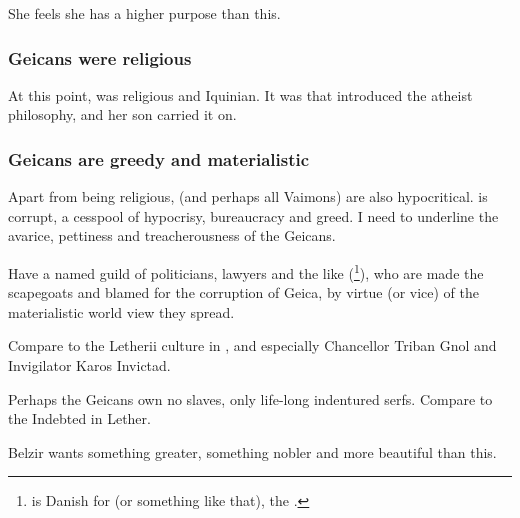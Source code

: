 She feels she has a higher purpose than this. 





\subsubsection{Geicans were religious}
At this point, \ClanGeican was religious and Iquinian.
It was \Belzir{} that introduced the atheist philosophy, and her son  carried it on. 





\subsubsection{Geicans are greedy and materialistic}
Apart from being religious, \ClanGeican (and perhaps all Vaimons) are also hypocritical. \ShiinMerodar{} is corrupt, a cesspool of hypocrisy, bureaucracy and greed. I need to underline the avarice, pettiness and treacherousness of the Geicans. 

Have a named guild of politicians, lawyers and the like (\footnote{\quo{\DJOF} is Danish for  (or something like that), the .}), who are made the scapegoats and blamed for the corruption of Geica, by virtue (or vice) of the materialistic world view they spread. 

Compare to the Letherii culture in \SEMalazan, and especially Chancellor Triban Gnol and Invigilator Karos Invictad. 

Perhaps the Geicans own no slaves, only life-long indentured serfs. Compare to the Indebted in Lether. 

Belzir wants something greater, something nobler and more beautiful than this. 






